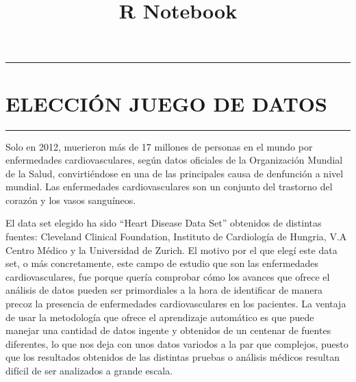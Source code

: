 \documentclass[
]{article}
\title{R Notebook}
\author{}
\date{\vspace{-2.5em}}
\begin{document}
\maketitle

\begin{center}\rule{0.5\linewidth}{0.5pt}\end{center}

\hypertarget{elecciuxf3n-juego-de-datos}{%
\section{ELECCIÓN JUEGO DE DATOS}\label{elecciuxf3n-juego-de-datos}}

\begin{center}\rule{0.5\linewidth}{0.5pt}\end{center}

Solo en 2012, muerieron más de 17 millones de personas en el mundo por
enfermedades cardiovasculares, según datos oficiales de la Organización
Mundial de la Salud, convirtiéndose en una de las principales causa de
denfunción a nivel mundial. Las enfermedades cardiovasculares son un
conjunto del trastorno del corazón y los vasos sanguíneos.

El data set elegido ha sido ``Heart Disease Data Set'' obtenidos de
distintas fuentes: Cleveland Clinical Foundation, Instituto de
Cardiología de Hungria, V.A Centro Médico y la Universidad de Zurich. El
motivo por el que elegí este data set, o más concretamente, este campo
de estudio que son las enfermedades cardiovasculares, fue porque quería
comprobar cómo los avances que ofrece el análisis de datos pueden ser
primordiales a la hora de identificar de manera precoz la presencia de
enfermedades cardiovasculares en los pacientes. La ventaja de usar la
metodología que ofrece el aprendizaje automático es que puede manejar
una cantidad de datos ingente y obtenidos de un centenar de fuentes
diferentes, lo que nos deja con unos datos variodos a la par que
complejos, puesto que los resultados obtenidos de las distintas pruebas
o análisis médicos resultan difícil de ser analizados a grande escala.
\end{document}
